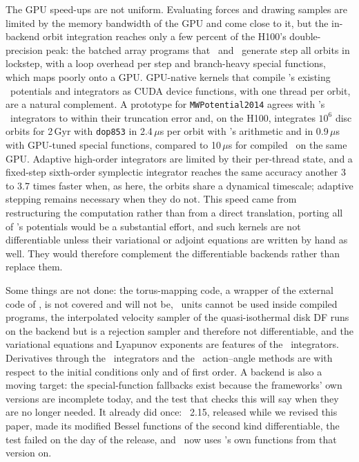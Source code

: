 The GPU speed-ups are not uniform. Evaluating forces and drawing samples
are limited by the memory bandwidth of the GPU and come close to it, but
the in-backend orbit integration reaches only a few percent of the
H100's double-precision peak: the batched array programs that \jax\
and \torch\ generate step all orbits in lockstep, with a loop overhead
per step and branch-heavy special functions, which maps poorly onto a
GPU. GPU-native kernels that compile \galpy's existing \cc\ potentials
and integrators as CUDA device functions, with one thread per orbit,
are a natural complement. A prototype for \texttt{MWPotential2014}
agrees with \galpy's \cc\ integrators to within their truncation error
and, on the H100, integrates $10^6$ disc orbits for 2\,Gyr with
\texttt{dop853} in 2.4\,$\mu$s per orbit with \galpy's arithmetic and in
0.9\,$\mu$s with GPU-tuned special functions, compared to 10\,$\mu$s for
compiled \jax\ on the same GPU. Adaptive high-order integrators are
limited by their per-thread state, and a fixed-step sixth-order
symplectic integrator reaches the same accuracy another 3 to 3.7 times
faster when, as here, the orbits share a dynamical timescale; adaptive
stepping remains necessary when they do not. This speed came from
restructuring the computation rather than from a direct translation,
porting all of \galpy's potentials would be a substantial effort, and
such kernels are not differentiable unless their variational or
adjoint equations are written by hand as well. They would therefore
complement the differentiable backends rather than replace them.

Some things are not done: the torus-mapping code, a wrapper of the
external code of \citet{BinneyMcMillan2016}, is not covered and will not
be, \astropy\ units cannot be used inside compiled programs, the
interpolated velocity sampler of the quasi-isothermal disk DF runs on
the backend but is a rejection sampler and therefore not differentiable,
and the variational
equations and Lyapunov exponents are features of the \cc\
integrators. Derivatives through the \cc\ integrators and the \cc\
action--angle methods are with respect to the initial conditions only
and of first order. A backend is also a moving target: the special-function fallbacks exist
because the frameworks' own versions are incomplete today, and the test
that checks this will say when they are no longer needed. It already
did once: \torch~2.15, released while we revised this paper, made its
modified Bessel functions of the second kind differentiable, the test
failed on the day of the release, and \galpy\ now uses \torch's own
functions from that version on.

